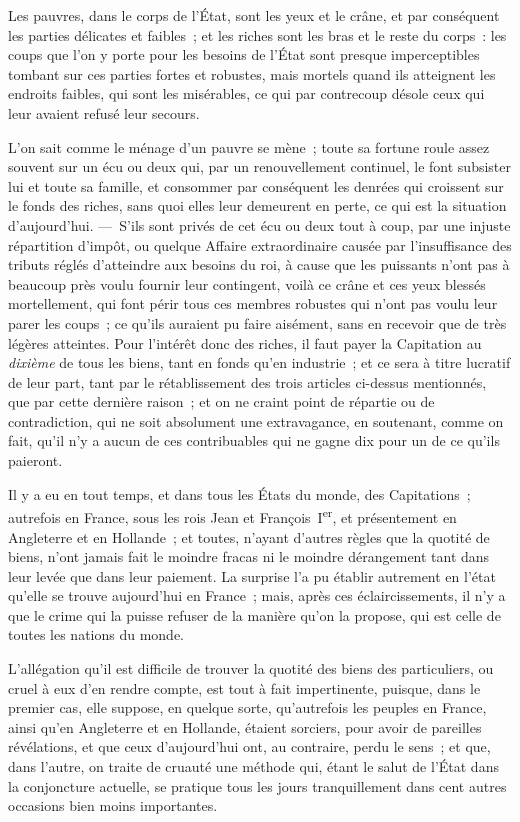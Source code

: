 \documentclass[french,twoside]{book} %
\begin{document}
Les pauvres, dans le corps de l’État, sont les yeux et le crâne, et par conséquent les parties délicates et faibles ; et les riches sont les bras et le reste du corps : les coups que l’on y porte pour les besoins de l’État sont presque imperceptibles tombant sur ces parties fortes et robustes, mais mortels quand ils atteignent les endroits faibles, qui sont les misérables, ce qui par contrecoup désole ceux qui leur avaient refusé leur secours.\par
L’on sait comme le ménage d’un pauvre se mène ; toute sa fortune roule assez souvent sur un écu ou deux qui, par un renouvellement continuel, le font subsister lui et toute sa famille, et consommer par conséquent les denrées qui croissent sur le fonds des riches, sans quoi elles leur demeurent en perte, ce qui est la situation d’aujourd’hui. — S’ils sont privés de cet écu ou deux tout à coup, par une injuste répartition d’impôt, ou quelque Affaire extraordinaire causée par l’insuffisance des tributs réglés d’atteindre aux besoins du roi, à cause que les puissants n’ont pas à beaucoup près voulu fournir leur contingent, voilà ce crâne et ces yeux blessés mortellement, qui font périr tous ces membres robustes qui n’ont pas voulu leur parer les coups ; ce qu’ils auraient pu faire aisément, sans en recevoir que de très légères atteintes. Pour l’intérêt donc des riches, il faut payer la Capitation au {\itshape dixième} de tous les biens, tant en fonds qu’en industrie ; et ce sera à titre lucratif de leur part, tant par le rétablissement des trois articles ci-dessus mentionnés, que par cette dernière raison ; et on ne craint point de répartie ou de contradiction, qui ne soit absolument une extravagance, en soutenant, comme on fait, qu’il n’y a aucun de ces contribuables qui ne gagne dix pour un de ce qu’ils paieront.\par
Il y a eu en tout temps, et dans tous les États du monde, des Capitations ; autrefois en France, sous les rois Jean et François I\textsuperscript{er}, et présentement en Angleterre et en Hollande ; et toutes, n’ayant d’autres règles que la quotité de biens, n’ont jamais fait le moindre fracas ni le moindre dérangement tant dans leur levée que dans leur paiement. La surprise l’a pu établir autrement en l’état qu’elle se trouve aujourd’hui en France ; mais, après ces éclaircissements, il n’y a que le crime qui la puisse refuser de la manière qu’on la propose, qui est celle de toutes les nations du monde.\par
L’allégation qu’il est difficile de trouver la quotité des biens des particuliers, ou cruel à eux d’en rendre compte, est tout à fait impertinente, puisque, dans le premier cas, elle suppose, en quelque sorte, qu’autrefois les peuples en France, ainsi qu’en Angleterre et en Hollande, étaient sorciers, pour avoir de pareilles révélations, et que ceux d’aujourd’hui ont, au contraire, perdu le sens ; et que, dans l’autre, on traite de cruauté une méthode qui, étant le salut de l’État dans la conjoncture actuelle, se pratique tous les jours tranquillement dans cent autres occasions bien moins importantes.\par
\end{document}
